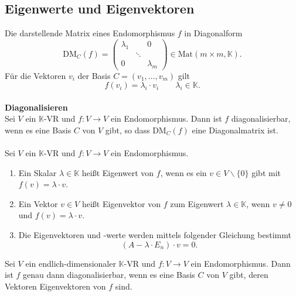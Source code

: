 \documentclass[a4paper,12pt]{article}
\numberwithin{equation}{section}
\begin{document}
\subsection{Eigenwerte und Eigenvektoren}
Die darstellende Matrix eines Endomorphismus $f$ in Diagonalform
\[ 
        \text{DM}_C\left(f\right)=\left(\begin{matrix}
                        \lambda _1&&0\\
                                  &\ddots &\\
                        0&&\lambda _m
        \end{matrix}\right) \in \text{Mat}\left(m\times m,\mathbb{K}\right)
.\] 
Für die Vektoren $v_i$ der Basis $C=\left(v_1,\hdots ,v_m\right)$ gilt
\[ 
        f\left(v_i\right)=\lambda _i\cdot v_i\qquad \lambda _i \in \mathbb{K}
.\] 
\hfill\\\textbf{Diagonalisieren}\\ 
Sei $V$ ein $\mathbb{K}$-VR und $f:V\rightarrow V$ ein Endomorphismus. Dann ist $f$ diagonalisierbar, wenn es eine Basis $C$ von $V$ gibt, so dass $\text{DM}_C\left(f\right)$ eine Diagonalmatrix ist.\\\\
Sei $V$ ein $\mathbb{K}$-VR und $f:V\rightarrow V$ ein Endomorphismus.
\begin{enumerate}[label=(\alph*)]
        \item Ein Skalar $\lambda  \in \mathbb{K}$ heißt Eigenwert von $f$, wenn es ein $v \in V\backslash\{0\}$ gibt mit $f\left(v\right)=\lambda \cdot v$.
        \item Ein Vektor $v \in V$ heißt Eigenvektor von $f$ zum Eigenwert $\lambda  \in \mathbb{K}$, wenn $v\neq 0$ und $f\left(v\right)=\lambda \cdot v$. 
        \item Die Eigenvektoren und -werte werden mittels folgender Gleichung bestimmt
                \[ 
                        \left(A-\lambda \cdot E_n\right)\cdot v=0
                .\] 
\end{enumerate} 
Sei $V$ ein endlich-dimensionaler $\mathbb{K}$-VR und $f:V\rightarrow V$ ein Endomorphismus. Dann ist $f$ genau dann diagonalisierbar, wenn es eine Basis $C$ von $V$ gibt, deren Vektoren Eigenvektoren von $f$ sind.
\end{document}
